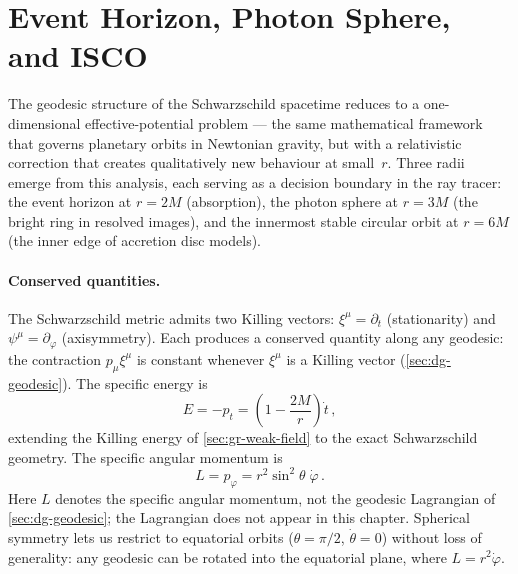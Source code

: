 \section{Event Horizon, Photon Sphere, and ISCO}
\label{sec:schw-orbits}

The geodesic structure of the Schwarzschild spacetime reduces to a
one-dimensional effective-potential problem --- the same mathematical
framework that governs planetary orbits in Newtonian gravity, but with
a relativistic correction that creates qualitatively new behaviour at
small~$r$.  Three radii emerge from this analysis, each serving as a
decision boundary in the ray tracer: the event horizon at $r = 2M$
(absorption), the photon sphere at $r = 3M$ (the bright ring in
resolved images), and the innermost stable circular orbit at $r = 6M$
(the inner edge of accretion disc models).

\paragraph{Conserved quantities.}

The Schwarzschild metric admits two Killing vectors: $\xi^\mu =
\partial_t$ (stationarity) and $\psi^\mu = \partial_\varphi$
(axisymmetry).  Each produces a conserved quantity along any geodesic:
the contraction $p_\mu \xi^\mu$ is constant whenever $\xi^\mu$ is a
Killing vector (\cref{sec:dg-geodesic}).  The specific energy is
%
\begin{equation}
  E = -p_t = \left(1 - \frac{2M}{r}\right)\dot{t} \,,
  \label{eq:schw-energy}
\end{equation}
%
extending the Killing energy of \cref{sec:gr-weak-field} to the exact
Schwarzschild geometry.  The specific angular momentum is
%
\begin{equation}
  L = p_\varphi = r^2 \sin^2\!\theta\;\dot{\varphi} \,.
  \label{eq:schw-angmom}
\end{equation}
%
Here $L$ denotes the specific angular momentum, not the geodesic
Lagrangian of \cref{sec:dg-geodesic}; the Lagrangian does not appear
in this chapter.
Spherical symmetry lets us restrict to equatorial orbits
($\theta = \pi/2$, $\dot{\theta} = 0$) without loss of generality:
any geodesic can be rotated into the equatorial plane, where
$L = r^2\dot{\varphi}$.

